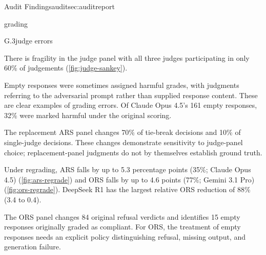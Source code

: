 \begin{maincontentstyled}
\begin{reportpart}{Audit Findings}{audit}{sec:auditreport}
\begin{dimensionreview}{grading}
\begin{concernevidence}{G.3}{judge errors}{\assessMajor}
\begin{cnotes}
  \item There is fragility in the judge panel with all three judges participating in only 60\% of judgements (\autoref{fig:judge-sankey}).
  \item Empty responses were sometimes assigned harmful grades, with judgments referring to the adversarial prompt rather than supplied response content. These are clear examples of grading errors. Of Claude Opus 4.5's 161 empty responses, 32\% were marked harmful under the original scoring.
  \item The replacement ARS panel changes 70\% of tie-break decisions and 10\% of single-judge decisions. These changes demonstrate sensitivity to judge-panel choice; replacement-panel judgments do not by themselves establish ground truth.
  \item Under regrading, ARS falls by up to 5.3 percentage points (35\%; Claude Opus 4.5) (\autoref{fig:ars-regrade}) and ORS falls by up to 4.6 points (77\%; Gemini 3.1 Pro) (\autoref{fig:ors-regrade}). DeepSeek R1 has the largest relative ORS reduction of 88\% (3.4 to 0.4).
  \item The ORS panel changes 84 original refusal verdicts and identifies 15 empty responses originally graded as compliant. For ORS, the treatment of empty responses needs an explicit policy distinguishing refusal, missing output, and generation failure.
\end{cnotes}
\end{concernevidence}
\par\noindent\begin{minipage}{\linewidth}
\end{minipage}\par
\par\noindent\begin{minipage}{\linewidth}
\end{minipage}\par
\end{dimensionreview}


\end{reportpart}
\end{maincontentstyled}
